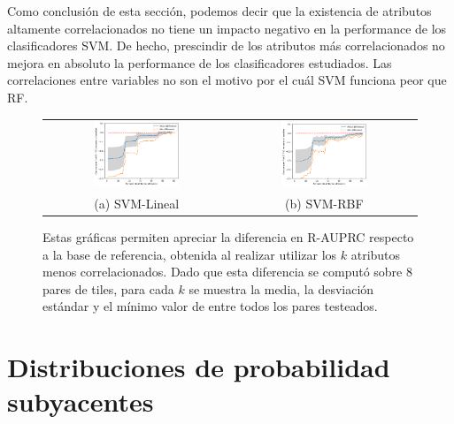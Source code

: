 Como conclusión de esta sección, podemos decir que la existencia de atributos altamente correlacionados no tiene un impacto negativo en la performance de los clasificadores SVM. De hecho, prescindir de los atributos más correlacionados no mejora en absoluto la performance de los clasificadores estudiados. Las correlaciones entre variables no son el motivo por el cuál SVM funciona peor que RF.

\begin{figure}[h!]
\begin{tabular}{cc}
  \includegraphics[width=0.49\textwidth]{Kap6/pearson_linear_CORRELATIONS_BIG_PICTURE.png} &   \includegraphics[width=0.49\textwidth]{Kap6/pearson_rbf_CORRELATIONS_BIG_PICTURE.png} \\
(a) SVM-Lineal & (b) SVM-RBF
\end{tabular}
\caption{Estas gráficas permiten apreciar la diferencia en R-AUPRC respecto a la base de referencia, obtenida al realizar utilizar los $k$ atributos menos correlacionados. Dado que esta diferencia se computó sobre 8 pares de tiles, para cada $k$ se muestra la media, la desviación estándar y el mínimo valor de entre todos los pares testeados. }
\label{fig:svm_correlation_summary}
\end{figure}

\section{Distribuciones de probabilidad subyacentes}


